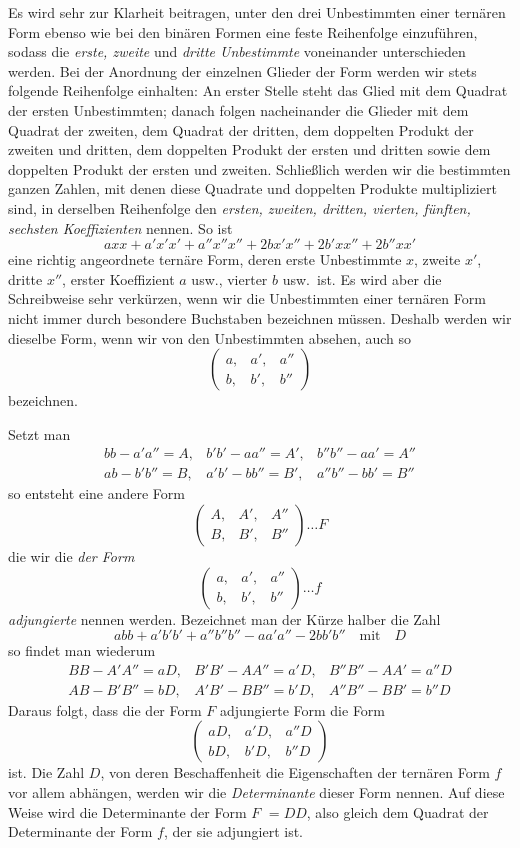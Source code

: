 Es wird sehr zur Klarheit beitragen, unter den drei Unbestimmten einer ternären Form ebenso wie bei den binären Formen eine feste Reihenfolge einzuführen, sodass die \textit{erste, zweite} und \textit{dritte Unbestimmte} voneinander unterschieden werden. Bei der Anordnung der einzelnen Glieder der Form werden wir stets folgende Reihenfolge einhalten: An erster Stelle steht das Glied mit dem Quadrat der ersten Unbestimmten; danach folgen nacheinander die Glieder mit dem Quadrat der zweiten, dem Quadrat der dritten, dem doppelten Produkt der zweiten und dritten, dem doppelten Produkt der ersten und dritten sowie dem doppelten Produkt der ersten und zweiten. Schließlich werden wir die bestimmten ganzen Zahlen, mit denen diese Quadrate und doppelten Produkte multipliziert sind, in derselben Reihenfolge den \textit{ersten, zweiten, dritten, vierten, fünften, sechsten Koeffizienten} nennen. So ist
\[
axx+a'x'x'+a''x''x''+2bx'x''+2b'xx''+2b''xx'
\]
eine richtig angeordnete ternäre Form, deren erste Unbestimmte $x$, zweite $x'$, dritte $x''$, erster Koeffizient $a$ usw., vierter $b$ usw.\ ist. Es wird aber die Schreibweise sehr verkürzen, wenn wir die Unbestimmten einer ternären Form nicht immer durch besondere Buchstaben bezeichnen müssen. Deshalb werden wir dieselbe Form, wenn wir von den Unbestimmten absehen, auch so
\[
\begin{pmatrix}
a, & a', & a'' \\
b, & b', & b''
\end{pmatrix}
\]
bezeichnen.

Setzt man
\[
\begin{array}{lll}
bb-a'a''=A, & b'b'-aa''=A', & b''b''-aa'=A'' \\
ab-b'b''=B, & a'b'-bb''=B', & a''b''-bb'=B''
\end{array}
\]
so entsteht eine andere Form
\[
\begin{pmatrix}
A, & A', & A'' \\
B, & B', & B''
\end{pmatrix}\ldots F
\]
die wir die \textit{der Form}
\[
\begin{pmatrix}
a, & a', & a'' \\
b, & b', & b''
\end{pmatrix}\ldots f
\]
\textit{adjungierte} nennen werden. Bezeichnet man der Kürze halber die Zahl
\[
abb+a'b'b'+a''b''b''-aa'a''-2bb'b''\quad\text{mit}\quad D
\]
so findet man wiederum
\[
\begin{array}{lll}
BB-A'A''=aD, & B'B'-AA''=a'D, & B''B''-AA'=a''D \\
AB-B'B''=bD, & A'B'-BB''=b'D, & A''B''-BB'=b''D
\end{array}
\]
Daraus folgt, dass die der Form $F$ adjungierte Form die Form
\[
\begin{pmatrix}
aD, & a'D, & a''D \\
bD, & b'D, & b''D
\end{pmatrix}
\]
ist. Die Zahl $D$, von deren Beschaffenheit die Eigenschaften der ternären Form $f$ vor allem abhängen, werden wir die \textit{Determinante} dieser Form nennen. Auf diese Weise wird die Determinante der Form $F$ $=DD$, also gleich dem Quadrat der Determinante der Form $f$, der sie adjungiert ist.

